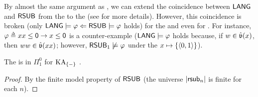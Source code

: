 \begin{remark}\label{remark: quantifier-free}
    By almost the same argument as , we can extend the coincidence between $\mathsf{LANG}$ and $\mathsf{RSUB}$ from the  to the  (see  for more details).
    However, this coincidence is broken (only $\LANG \models \fml \Leftarrow \RSUB \models \fml$ holds) for the  and even for .
    For instance, $\fml[1] \defeq x x \le \emp \to x \le \emp$ is a counter-example
    ($\LANG \models \fml$ holds because, if $\word \in \hat{\val}(x)$, then $\word \word \in \hat{\val}(x x)$;
    however, $\RSUB_1 \not\models \fml$ under the  $x \mapsto \{\langle0, 1\rangle\}$).
    \lipicsEnd
\end{remark}

\begin{corollary}\label{corollary: in Pi01}
    The  is in $\Pi^{0}_{1}$ for $\mathrm{KA}_{\{-\}}$ .
\end{corollary}
\begin{proof}
    By the finite model property of $\mathsf{RSUB}$ (the universe $|\mathsf{rsub}_{n}|$ is finite for each $n$).
\end{proof}


